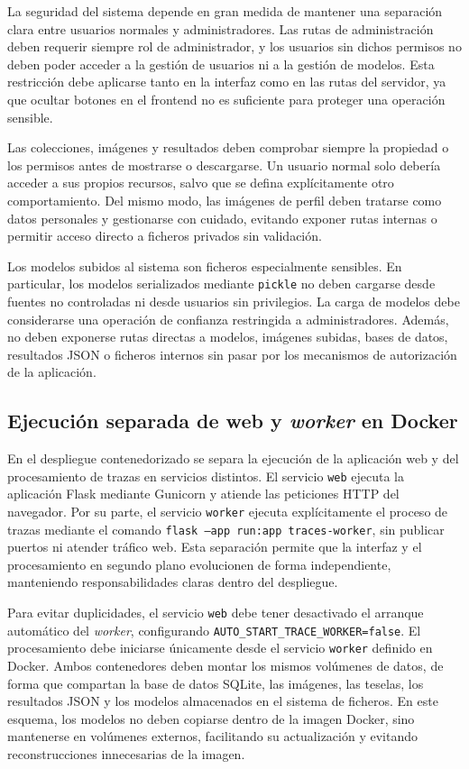 La seguridad del sistema depende en gran medida de mantener una separación clara entre usuarios normales y administradores. Las rutas de administración deben requerir siempre rol de administrador, y los usuarios sin dichos permisos no deben poder acceder a la gestión de usuarios ni a la gestión de modelos. Esta restricción debe aplicarse tanto en la interfaz como en las rutas del servidor, ya que ocultar botones en el frontend no es suficiente para proteger una operación sensible. 

Las colecciones, imágenes y resultados deben comprobar siempre la propiedad o los permisos antes de mostrarse o descargarse. Un usuario normal solo debería acceder a sus propios recursos, salvo que se defina explícitamente otro comportamiento. Del mismo modo, las imágenes de perfil deben tratarse como datos personales y gestionarse con cuidado, evitando exponer rutas internas o permitir acceso directo a ficheros privados sin validación. 

Los modelos subidos al sistema son ficheros especialmente sensibles. En particular, los modelos serializados mediante \texttt{pickle} no deben cargarse desde fuentes no controladas ni desde usuarios sin privilegios. La carga de modelos debe considerarse una operación de confianza restringida a administradores. Además, no deben exponerse rutas directas a modelos, imágenes subidas, bases de datos, resultados JSON o ficheros internos sin pasar por los mecanismos de autorización de la aplicación.

\subsection{Ejecución separada de web y \textit{worker} en Docker}

En el despliegue contenedorizado se separa la ejecución de la aplicación web y del procesamiento de trazas en servicios distintos. El servicio \texttt{web} ejecuta la aplicación Flask mediante Gunicorn y atiende las peticiones HTTP del navegador. Por su parte, el servicio \texttt{worker} ejecuta explícitamente el proceso de trazas mediante el comando \texttt{flask --app run:app traces-worker}, sin publicar puertos ni atender tráfico web. Esta separación permite que la interfaz y el procesamiento en segundo plano evolucionen de forma independiente, manteniendo responsabilidades claras dentro del despliegue.

Para evitar duplicidades, el servicio \texttt{web} debe tener desactivado el arranque automático del \textit{worker}, configurando \texttt{AUTO\_START\_TRACE\_WORKER=false}. El procesamiento debe iniciarse únicamente desde el servicio \texttt{worker} definido en Docker. Ambos contenedores deben montar los mismos volúmenes de datos, de forma que compartan la base de datos SQLite, las imágenes, las teselas, los resultados JSON y los modelos almacenados en el sistema de ficheros. En este esquema, los modelos no deben copiarse dentro de la imagen Docker, sino mantenerse en volúmenes externos, facilitando su actualización y evitando reconstrucciones innecesarias de la imagen.

